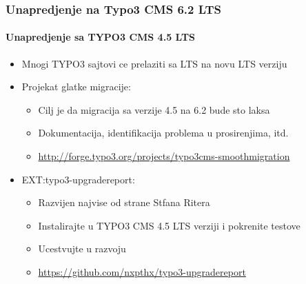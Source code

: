 
\begin{frame}[fragile]
	\frametitle{Unapredjenje na Typo3 CMS 6.2 LTS}
	\framesubtitle{Unapredjenje sa TYPO3 CMS 4.5 LTS}

	\begin{itemize}
		\item Mnogi TYPO3 sajtovi ce prelaziti sa LTS na novu LTS verziju
		\item Projekat glatke migracije:

			\begin{itemize}
				\item Cilj je da migracija sa verzije 4.5 na 6.2 bude sto laksa
				\item Dokumentacija, identifikacija problema u prosirenjima, itd.
				\item \smaller\url{http://forge.typo3.org/projects/typo3cms-smoothmigration}\normalsize
			\end{itemize}

		\item EXT:typo3-upgradereport:

			\begin{itemize}
				\item Razvijen najvise od strane Stfana Ritera
				\item Instalirajte u TYPO3 CMS 4.5 LTS verziji i pokrenite testove
				\item Ucestvujte u razvoju
				\item \smaller\url{https://github.com/nxpthx/typo3-upgradereport}\normalsize
			\end{itemize}
	\end{itemize}

\end{frame}


